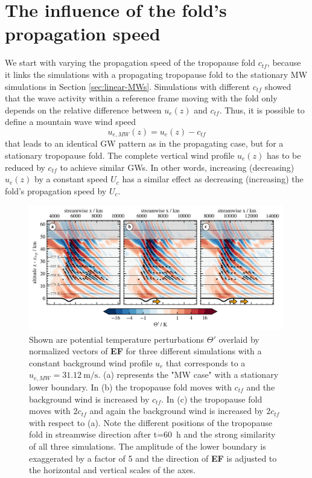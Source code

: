 \section{The influence of the fold's propagation speed}
\label{sec:q3D-speed}
We start with varying the propagation speed of the tropopause fold $c_{tf}$, because it links the simulations with a propagating tropopause fold to the stationary MW simulations in Section \ref{sec:linear-MWs}. Simulations with different $c_{tf}$ showed that the wave activity within a reference frame moving with the fold only depends on the relative difference between $u_e(z)$ and $c_{tf}$. Thus, it is possible to define a mountain wave wind speed
\begin{equation}
    u_{e,MW}(z) = u_e(z)-c_{tf}
    \label{equ:MW_forcing}
\end{equation}
that leads to an identical GW pattern as in the propagating case, but for a stationary tropopause fold. The complete vertical wind profile $u_e(z)$ has to be reduced by $c_{tf}$ to achieve similar GWs. In other words, increasing (decreasing) $u_e(z)$ by a constant speed $U_c$ has a similar effect as decreasing (increasing) the fold's propagation speed by $U_c$.
\begin{figure}[t]
    \centering
    \includegraphics[width=0.99\textwidth]{figures_q3D/Q3D-TH-EF-ctropo.png}
    \caption{Shown are potential temperature perturbations $\Theta'$ overlaid by normalized vectors of \textbf{EF} for three different simulations with a constant background wind profile $u_e$ that corresponds to a $u_{e,MW}=\SI{31.12}{\meter\per\second}$. (a) represents the "MW case" with a stationary lower boundary. In (b) the tropopause fold moves with $c_{tf}$ and the background wind is increased by $c_{tf}$. In (c) the tropopause fold moves with $2c_{tf}$ and again the background wind is increased by $2c_{tf}$ with respect to (a). Note the different positions of the tropopause fold in streamwise direction after t=\SI{60}{\hour} and the strong similarity of all three simulations. The amplitude of the lower boundary is exaggerated by a factor of 5 and the direction of \textbf{EF} is adjusted to the horizontal and vertical scales of the axes.}
    \label{fig:q3D_ctropo}
\end{figure}
